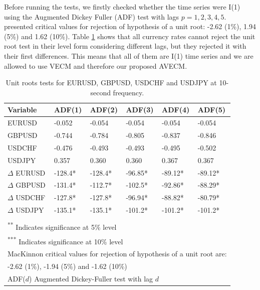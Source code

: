 Before running the tests, we firstly checked whether the time series were I(1)
using the Augmented Dickey Fuller (ADF) test with lags $p=1,2,3,4,5$.
\cite{mackinnon2010} presented critical values for rejection of hypothesis of a
unit root: -2.62 (1\%), 1.94 (5\%) and 1.62 (10\%).
Table \ref{tab:adf} shows that all currency rates cannot reject the unit root
test in their level form considering different lags, but they rejected it with
their first differences. This means that all of them are I(1) time series and we
are allowed to use VECM and therefore our proposed AVECM.
\begin{table}[ht]
\centering
\begin{tabular}{llllll}
\toprule
{Variable} & {ADF(1)} & {ADF(2)} & {ADF(3)} & {ADF(4)} & {ADF(5)}\\ 
\midrule
EURUSD &  -0.052   & -0.054  & -0.054  & -0.054  & -0.054  \\
GBPUSD &  -0.744  & -0.784  & -0.805  & -0.837  & -0.846  \\
USDCHF &  -0.476   & -0.493  & -0.493  & -0.495  & -0.502  \\
USDJPY &  0.357   & 0.360  & 0.360  & 0.367  & 0.367  \\
$\Delta$ EURUSD & -128.4*  & -128.4*  & -96.85* & -89.12*   & -89.12*\\
$\Delta$ GBPUSD & -131.4*  & -112.7*  & -102.5* & -92.86*   & -88.29*\\
$\Delta$ USDCHF & -127.8*  & -127.8*  & -96.94* & -88.82*   & -80.79*\\
$\Delta$ USDJPY & -135.1*  & -135.1*  & -101.2* & -101.2*   & -101.2*\\
\bottomrule
\addlinespace[1ex]
\multicolumn{6}{l}{ \textsuperscript{*} Indicates significance at 1\% level} \\
\multicolumn{6}{l}{ \textsuperscript{**} Indicates significance at 5\% level} \\
\multicolumn{6}{l}{ \textsuperscript{***} Indicates significance at 10\% level} \\
\multicolumn{6}{l}{MacKinnon critical values for rejection of hypothesis of a unit root are:}\\
\multicolumn{6}{l}{ -2.62 (1\%), -1.94 (5\%) and -1.62 (10\%)}\\
\multicolumn{6}{l}{ADF($d$) Augmented Dickey-Fuller test with lag $d$} 
\end{tabular}
\caption{Unit roots tests for EURUSD, GBPUSD, USDCHF and USDJPY at 10-second
frequency.}
\label{tab:adf}
\end{table}

